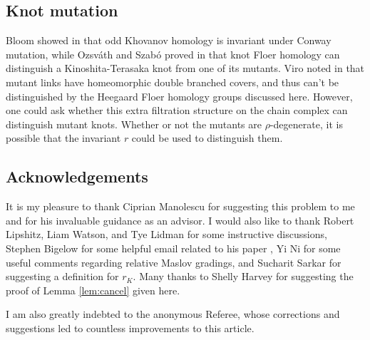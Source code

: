 \documentclass[11pt]{article}
\theoremstyle{plain} \newtheorem{thm}{Theorem}[subsection]
\theoremstyle{plain} \newtheorem{cor}[thm]{Corollary}
\theoremstyle{plain} \newtheorem{prop}[thm]{Proposition}
\theoremstyle{plain} \newtheorem{conj}[thm]{Conjecture}
\theoremstyle{plain} \newtheorem{lem}[thm]{Lemma}
\theoremstyle{definition} \newtheorem{df}[thm]{Definition}
\theoremstyle{remark} \newtheorem{rmk}[thm]{Remark}
\theoremstyle{remark} \newtheorem{obs}[thm]{Observation}
\newcommand{\OS}{Ozsv\'ath and Szab\'o }
\numberwithin{equation}{section}
\begin{document}
\subsection{Knot mutation}
Bloom showed in \cite{bloom:odd} that odd Khovanov homology is invariant under Conway mutation, while \OS proved in \cite{os:mutant} that knot Floer homology can distinguish a Kinoshita-Terasaka knot from one of its mutants.  Viro noted in \cite{viro:cover} that mutant links have homeomorphic double branched covers, and thus can't be distinguished by the Heegaard Floer homology groups discussed here.  However, one could ask whether this extra filtration structure on the chain complex can distinguish mutant knots.  Whether or not the mutants are $\rho$-degenerate, it is possible that the invariant $r$ could be used to distinguish them.

\subsection*{Acknowledgements}

It is my pleasure to thank Ciprian Manolescu for suggesting this problem to me and for his invaluable guidance as an advisor.  I would also like to thank Robert Lipshitz, Liam Watson, and Tye Lidman for some instructive discussions, Stephen Bigelow for some helpful email related to his paper \cite{big:jones}, Yi Ni for some useful comments regarding relative Maslov gradings, and Sucharit Sarkar for suggesting a definition for $r_{K}$.  Many thanks to Shelly Harvey for suggesting the proof of Lemma \ref{lem:cancel} given here.

I am also greatly indebted to the anonymous Referee, whose corrections and suggestions led to countless improvements to this article.



\end{document}
